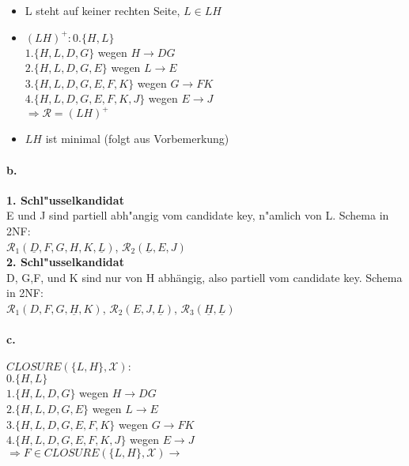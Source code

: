 \documentclass{article}
\begin{document}
		\begin{itemize}
			\item L steht auf keiner rechten Seite, $ L \in LH $ \checkmark
			\item $ (LH)^+: 0. \{H,L\} $\\
			$ 1. \{H,L,D,G\} $ \hspace*{23mm}wegen $ H \rightarrow DG $\\
			$ 2. \{H,L,D,G,E\} $ \hspace*{19mm}wegen $ L \rightarrow E $\\
			$ 3. \{H,L,D,G,E,F,K\} $ \hspace*{10mm}wegen $ G \rightarrow FK $\\
			$ 4. \{H,L,D,G,E,F,K,J\} $ \hspace*{7mm}wegen $ E \rightarrow J $\\
			$ \Rightarrow \mathcal{R} = (LH)^+ $ \checkmark
			\item $ LH $ ist minimal (folgt aus Vorbemerkung) \checkmark
		\end{itemize}	
	
		\paragraph*{b.}\textbf{1. Schl"usselkandidat}\\
		E und J sind partiell abh"angig vom candidate key, n"amlich von L. Schema in 2NF:\\
		$ \mathcal{R}_1(\underline{D},F,G,H,K,\underline{L}) $, $ \mathcal{R}_2(\underline{L},E,J) $\\[1.2em]
		
		\textbf{2. Schl"usselkandidat}\\
		D, G,F, und K sind nur von H abhängig, also partiell vom candidate key. Schema in 2NF:\\
		$ \mathcal{R}_1(D,F,G,\underline{H},K) $, $ \mathcal{R}_2(E,J,\underline{L}) $, $ \mathcal{R}_3(\underline{H},\underline{L}) $
		
		\paragraph*{c.}$ CLOSURE(\{L,H\}, \mathcal{X}):$\\
		$ 0. \{H,L\} $\\
		$ 1. \{H,L,D,G\} $ \hspace*{25mm}wegen $ H \rightarrow DG $\\
		$ 2. \{H,L,D,G,E\} $ \hspace*{21mm}wegen $ L \rightarrow E $\\
		$ 3. \{H,L,D,G,E,F,K\} $ \hspace*{13mm}wegen $ G \rightarrow FK $\\
		$ 4. \{H,L,D,G,E,F,K,J\} $ \hspace*{9mm}wegen $ E \rightarrow J $\\
		$ \Rightarrow F \in CLOSURE(\{L,H\}, \mathcal{X}) \rightarrow$ \checkmark
	\pagebreak
\end{document}
